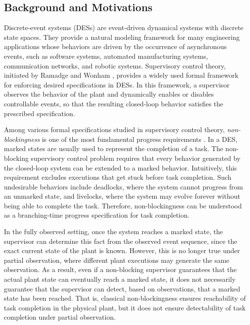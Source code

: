 \documentclass[twocolumn]{autart}
\begin{document}
\subsection{Background and Motivations}
Discrete-event systems (DESs) are event-driven dynamical systems with discrete state spaces. 
They provide a natural modeling framework for many engineering applications whose behaviors are driven by the occurrence of asynchronous events, such as software systems, automated manufacturing systems, communication networks, and robotic systems. 
Supervisory control theory, initiated by Ramadge and Wonham \cite{ramadge1987supervisory}, provides a widely used formal framework for enforcing desired specifications in DESs. 
In this framework, a supervisor observes the behavior of the plant and dynamically enables or disables controllable events, so that the resulting closed-loop behavior satisfies the prescribed specification.  

Among various formal specifications studied in supervisory control theory, \emph{non-blockingness} is one of the most fundamental progress requirements \cite{cassandras2021introduction}. In a DES, marked states are usually used to represent the completion of a task. 
The non-blocking supervisory control problem requires that every behavior generated by the closed-loop system can be extended to a marked behavior.  Intuitively, this requirement excludes executions that get stuck before task completion. 
Such undesirable behaviors include deadlocks, where the system cannot progress from an unmarked state, and livelocks, where the system may evolve forever without being able to complete the task.  Therefore, non-blockingness can be understood as a branching-time progress specification for task completion.

In the fully observed setting, once the system reaches a marked state, the supervisor can determine this fact from the observed event sequence, since the exact current state of the plant is known.  However, this is no longer true under partial observation, where different plant executions may generate the same observation. As a result, even if a non-blocking supervisor guarantees that the actual plant state can eventually reach a marked state, it does not necessarily guarantee that the supervisor can detect, based on observations, that a marked state has been reached. That is, classical non-blockingness ensures reachability of task completion in the physical plant, but it does not ensure detectability of task completion under partial observation.
\end{document}
